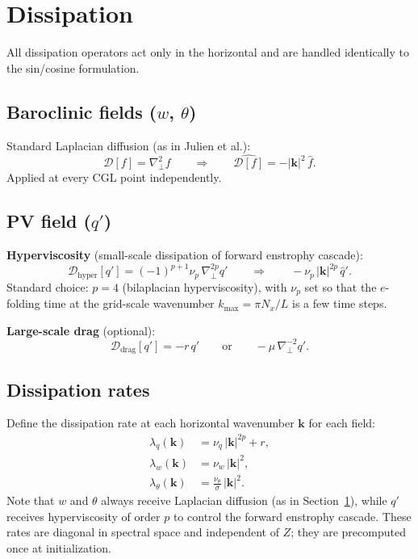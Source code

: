 \documentclass[11pt]{article}
\newcommand{\kh}{|\bm{k}|}
\newcommand{\hhat}[1]{\widehat{#1}}
\begin{document}
\section{Dissipation}
\label{sec:dissipation}

All dissipation operators act only in the horizontal and are handled identically to the sin/cosine formulation.

\subsection{Baroclinic fields ($w$, $\theta$)}

Standard Laplacian diffusion (as in Julien et al.):
\begin{equation}
\mathcal{D}[f] = \nabla_\perp^2 f \qquad\Longrightarrow\qquad \widehat{\mathcal{D}[f]} = -\kh^2\,\hhat{f}.
\end{equation}
Applied at every CGL point independently.

\subsection{PV field ($q'$)}

\noindent\textbf{Hyperviscosity} (small-scale dissipation of forward enstrophy cascade):
\begin{equation}
\mathcal{D}_{\mathrm{hyper}}[q'] = (-1)^{p+1}\nu_p\,\nabla_\perp^{2p} q' \qquad\Longrightarrow\qquad -\nu_p\,\kh^{2p}\,\hhat{q}'.
\end{equation}
Standard choice: $p = 4$ (bilaplacian hyperviscosity), with $\nu_p$ set so that the $e$-folding time at the grid-scale wavenumber $k_{\max} = \pi N_x/L$ is a few time steps.

\noindent\textbf{Large-scale drag} (optional):
\begin{equation}
\mathcal{D}_{\mathrm{drag}}[q'] = -r\,q' \qquad\text{or}\qquad -\mu\,\nabla_\perp^{-2}q'.
\end{equation}

\subsection{Dissipation rates}
\label{sec:diss_rates}

Define the dissipation rate at each horizontal wavenumber $\bm{k}$ for each field:
\begin{align}
\lambda_q(\bm{k}) &= \nu_q\,\kh^{2p} + r, \label{eq:diss_rate_q}\\
\lambda_w(\bm{k}) &= \nu_w\,\kh^{2}, \label{eq:diss_rate_w}\\
\lambda_\theta(\bm{k}) &= \frac{\nu_\theta}{\sigma}\,\kh^{2}. \label{eq:diss_rate_th}
\end{align}
Note that $w$ and $\theta$ always receive Laplacian diffusion (as in Section~\ref{sec:dissipation}), while $q'$ receives hyperviscosity of order $p$ to control the forward enstrophy cascade.
These rates are diagonal in spectral space and independent of $Z$; they are precomputed once at initialization.
\end{document}
